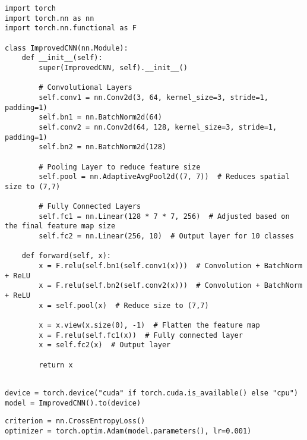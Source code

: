 \documentclass{article}
\begin{document}
\begin{verbatim}
import torch
import torch.nn as nn
import torch.nn.functional as F

class ImprovedCNN(nn.Module):
    def __init__(self):
        super(ImprovedCNN, self).__init__()

        # Convolutional Layers
        self.conv1 = nn.Conv2d(3, 64, kernel_size=3, stride=1, padding=1)
        self.bn1 = nn.BatchNorm2d(64)
        self.conv2 = nn.Conv2d(64, 128, kernel_size=3, stride=1, padding=1)
        self.bn2 = nn.BatchNorm2d(128)

        # Pooling Layer to reduce feature size
        self.pool = nn.AdaptiveAvgPool2d((7, 7))  # Reduces spatial size to (7,7)

        # Fully Connected Layers
        self.fc1 = nn.Linear(128 * 7 * 7, 256)  # Adjusted based on the final feature map size
        self.fc2 = nn.Linear(256, 10)  # Output layer for 10 classes

    def forward(self, x):
        x = F.relu(self.bn1(self.conv1(x)))  # Convolution + BatchNorm + ReLU
        x = F.relu(self.bn2(self.conv2(x)))  # Convolution + BatchNorm + ReLU
        x = self.pool(x)  # Reduce size to (7,7)

        x = x.view(x.size(0), -1)  # Flatten the feature map
        x = F.relu(self.fc1(x))  # Fully connected layer
        x = self.fc2(x)  # Output layer

        return x


\end{verbatim}

\begin{verbatim}
device = torch.device("cuda" if torch.cuda.is_available() else "cpu")
model = ImprovedCNN().to(device)

\end{verbatim}

\begin{verbatim}
criterion = nn.CrossEntropyLoss()
optimizer = torch.optim.Adam(model.parameters(), lr=0.001)

\end{verbatim}
\end{document}
